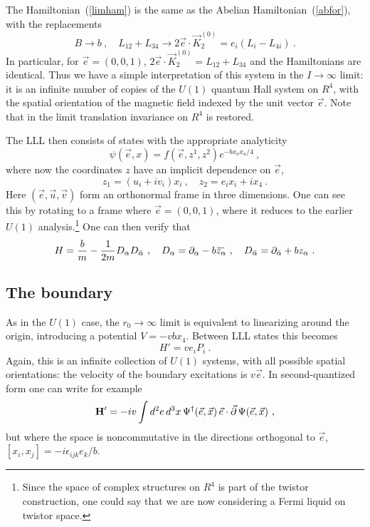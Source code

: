 \documentclass[a4paper,12pt]{article}
\newcommand{\R}{R}
\newcommand{\OL}[1]{ \hspace{1pt}\overline{\hspace{-1pt}#1
   \hspace{-2pt}}\hspace{2pt} }
\begin{document}
The Hamiltonian~(\ref{limham}) is the same as the Abelian
Hamiltonian~(\ref{abfor}), with the replacements
\begin{equation}
B \to b\ ,\quad L_{12} + L_{34} \to 2 \vec e \cdot \vec K_2^{(0)}
= e_i (L_i -  L_{4i})\ .
\end{equation}
In particular, for $\vec  e = (0,0,1)$, $2 \vec e \cdot \vec K_2^{(0)} =
L_{12} + L_{34}$ and the Hamiltonians are identical.  Thus we have a simple
interpretation of this system in the $I \to \infty$ limit: it is an infinite
number of copies of the $U(1)$ quantum Hall system on $\R^4$, with the
spatial orientation of the magnetic field indexed by the unit vector $\vec 
e$.  Note that in the limit translation invariance on $\R^4$ is restored.

The LLL then consists of states with the appropriate analyticity 
\begin{equation}
\psi(\vec  e, x) = 
f(\vec e, z^1,z^2) e^{-b x_a x_a/4}\ ,
\end{equation}
where now the coordinates $z$ have an implicit dependence on $\vec e$,
\begin{equation}
z_1 = (u_i+ i v_i) x_i\ ,\quad z_2 = e_i x_i + i x_4\ .
\end{equation}
Here $(\vec e,\vec u,\vec v)$ form an orthonormal frame in three dimensions.
One can see this by rotating to a frame where $\vec e = (0,0,1)$, where it
reduces to the earlier
$U(1)$ analysis.\footnote
{Since the space of complex structures on $\R^4$ is part of the twistor
construction, one could say that we are now considering a Fermi liquid on
twistor space.}
One can then verify that
\begin{equation}
H = \frac{b}{m} - \frac{1}{2m} D_{\alpha} D_{\bar \alpha}
\ ,\quad D_{\alpha} = \partial_{\alpha} - b \OL{ z_\alpha}\ ,\quad
D_{\bar\alpha} = \partial_{\bar\alpha} + b z_\alpha\ .
\end{equation}

\subsection{The boundary}

As in the $U(1)$ case, the $r_0 \to \infty$ limit is equivalent to linearizing
around the origin, introducing a potential $V = -vb x_4$.  Between
LLL states this becomes
\begin{equation}
H' = v e_i P_i\ .
\end{equation}
Again, this is an infinite collection of $U(1)$ systems, with all possible
spatial orientations: the velocity of the boundary excitations is $v\vec e$.
In second-quantized form one can write for example
\begin{equation}
{\bf H}' = - i v \int  d^2e\, d^3x\, \Psi^\dagger(\vec e,\vec x) \,\vec e \cdot
\vec \partial \,
\Psi(\vec e,\vec x)\ ,
\end{equation}
but where the space is noncommutative in the directions orthogonal to $\vec e$,
$[x_i,x_j] = -i \epsilon_{ijk} e_k/b$.
\end{document}
